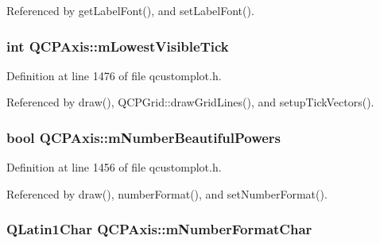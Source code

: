 Referenced by get\+Label\+Font(), and set\+Label\+Font().

\hypertarget{class_q_c_p_axis_aebb24ba8734b7e054efc6e1ecc5414c7}{}
\subsubsection[{m\+Lowest\+Visible\+Tick}]{\setlength{\rightskip}{0pt plus 5cm}int Q\+C\+P\+Axis\+::m\+Lowest\+Visible\+Tick\hspace{0.3cm}{\ttfamily [protected]}}\label{class_q_c_p_axis_aebb24ba8734b7e054efc6e1ecc5414c7}


Definition at line 1476 of file qcustomplot.\+h.



Referenced by draw(), Q\+C\+P\+Grid\+::draw\+Grid\+Lines(), and setup\+Tick\+Vectors().

\hypertarget{class_q_c_p_axis_af03809bee3f3e35fcc38d25b6dd5003b}{}
\subsubsection[{m\+Number\+Beautiful\+Powers}]{\setlength{\rightskip}{0pt plus 5cm}bool Q\+C\+P\+Axis\+::m\+Number\+Beautiful\+Powers\hspace{0.3cm}{\ttfamily [protected]}}\label{class_q_c_p_axis_af03809bee3f3e35fcc38d25b6dd5003b}


Definition at line 1456 of file qcustomplot.\+h.



Referenced by draw(), number\+Format(), and set\+Number\+Format().

\hypertarget{class_q_c_p_axis_a39594313deef458f425bba25cd337a8a}{}
\subsubsection[{m\+Number\+Format\+Char}]{\setlength{\rightskip}{0pt plus 5cm}Q\+Latin1\+Char Q\+C\+P\+Axis\+::m\+Number\+Format\+Char\hspace{0.3cm}{\ttfamily [protected]}}\label{class_q_c_p_axis_a39594313deef458f425bba25cd337a8a}


